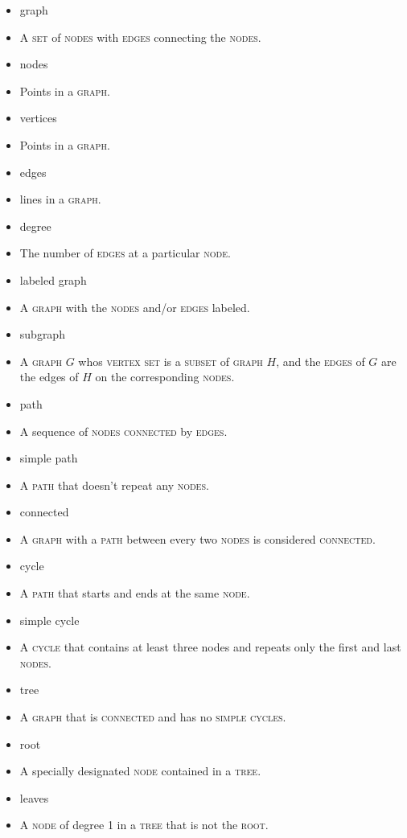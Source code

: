 \documentclass{article}
\newcommand{\term}[1]{\textsc{#1}}
\begin{document}
\bigskip \indent
\begin{itemize}
\item graph
 \item A \term{set} of \term{nodes} with \term{edges} connecting the \term{nodes}.
\item nodes
 \item Points in a \term{graph}.
\item vertices
 \item Points in a \term{graph}.
\item edges
 \item lines in a \term{graph}.
\item degree
 \item The number of \term{edges} at a particular \term{node}.
\item labeled graph
 \item A \term{graph} with the \term{nodes} and/or \term{edges} labeled.
\item subgraph
 \item A \term{graph} $G$ whos \term{vertex} \term{set} is a \term{subset} of \term{graph} $H$, and the \term{edges} of $G$ are the edges of $H$ on the corresponding \term{nodes}.
\item path
 \item A sequence of \term{nodes} \term{connected} by \term{edges}.
\item simple path
 \item A \term{path} that doesn't repeat any \term{nodes}.
\item connected
 \item A \term{graph} with a \term{path} between every two \term{nodes} is considered \term{connected}.
\item cycle
 \item A \term{path} that starts and ends at the same \term{node}.
\item simple cycle
 \item A \term{cycle} that contains at least three nodes and repeats only the first and last \term{nodes}.
\item tree
 \item A \term{graph} that is \term{connected} and has no \term{simple cycles}.
\item root
 \item A specially designated \term{node} contained in a \term{tree}.
\item leaves
 \item A \term{node} of degree 1 in a \term{tree} that is not the \term{root}.

\end{itemize}
\end{document}
